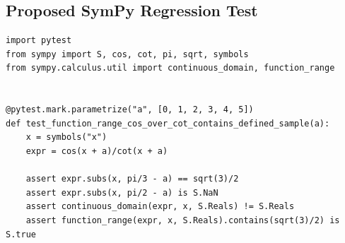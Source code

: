 \documentclass[11pt]{article}
\begin{document}
\subsection{Proposed SymPy Regression Test}

\medskip

\begin{lstlisting}[style=bugpython]
import pytest
from sympy import S, cos, cot, pi, sqrt, symbols
from sympy.calculus.util import continuous_domain, function_range


@pytest.mark.parametrize("a", [0, 1, 2, 3, 4, 5])
def test_function_range_cos_over_cot_contains_defined_sample(a):
    x = symbols("x")
    expr = cos(x + a)/cot(x + a)

    assert expr.subs(x, pi/3 - a) == sqrt(3)/2
    assert expr.subs(x, pi/2 - a) is S.NaN
    assert continuous_domain(expr, x, S.Reals) != S.Reals
    assert function_range(expr, x, S.Reals).contains(sqrt(3)/2) is S.true
\end{lstlisting}
\end{document}
